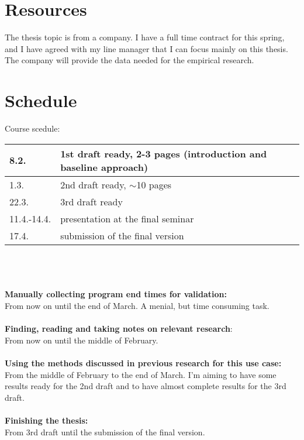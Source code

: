 \documentclass[12pt,a4paper,english,oneside]{article}
\begin{document}
\section{Resources}

The thesis topic is from a company. I have a full time contract for this spring, and I have agreed with my line manager that I can focus mainly on this thesis. The company will provide the data needed for the empirical research.

\section{Schedule}

Course scedule:

\begin{tabular}{|p{20mm}|p{130mm}|}
\hline
8.2.   & 1st draft ready, 2-3 pages (introduction and baseline approach)\\ \hline
1.3.   & 2nd draft ready, $\sim$10 pages \\ \hline
22.3.  & 3rd draft ready \\ \hline
11.4.-14.4. & presentation at the final seminar \\ \hline
17.4.  & submission of the final version \\ \hline
\end{tabular}
\\
\\
\\
\textbf{Manually collecting program end times for validation:}\\
From now on until the end of March. A menial, but time consuming task.
\\
\\
\textbf{Finding, reading and taking notes on relevant research}:\\
From now on until the middle of February.  
\\
\\
\textbf{Using the methods discussed in previous research for this use case:}\\
From the middle of February to the end of March. I'm aiming to have some results ready for the 2nd draft and to have almost complete results for the 3rd draft.
\\
\\
\textbf{Finishing the thesis:}\\
From 3rd draft until the submission of the final version.
\end{document}

